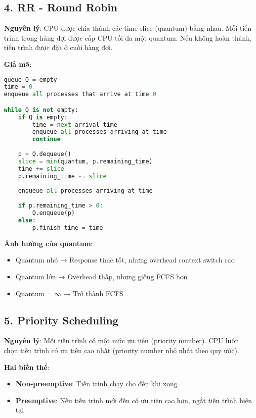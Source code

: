 \subsection{4. RR - Round Robin}

\textbf{Nguyên lý}: CPU được chia thành các time slice (quantum) bằng nhau. 
Mỗi tiến trình trong hàng đợi được cấp CPU tối đa một quantum. 
Nếu không hoàn thành, tiến trình được đặt ở cuối hàng đợi.

\textbf{Giả mã}:
\begin{lstlisting}[language=Python,caption={RR pseudocode}]
queue Q = empty
time = 0
enqueue all processes that arrive at time 0

while Q is not empty:
    if Q is empty:
        time = next arrival time
        enqueue all processes arriving at time
        continue
    
    p = Q.dequeue()
    slice = min(quantum, p.remaining_time)
    time += slice
    p.remaining_time -= slice
    
    enqueue all processes arriving at time
    
    if p.remaining_time > 0:
        Q.enqueue(p)
    else:
        p.finish_time = time
\end{lstlisting}

\textbf{Ảnh hưởng của quantum}:
\begin{itemize}[leftmargin=1.5cm]
  \item Quantum nhỏ → Response time tốt, nhưng overhead context switch cao
  \item Quantum lớn → Overhead thấp, nhưng giống FCFS hơn
  \item Quantum = $\infty$ → Trở thành FCFS
\end{itemize}

\subsection{5. Priority Scheduling}

\textbf{Nguyên lý}: Mỗi tiến trình có một mức ưu tiên (priority number). 
CPU luôn chọn tiến trình có ưu tiên cao nhất (priority number nhỏ nhất theo quy ước).

\textbf{Hai biến thể}:
\begin{itemize}[leftmargin=1.5cm]
  \item \textbf{Non-preemptive}: Tiến trình chạy cho đến khi xong
  \item \textbf{Preemptive}: Nếu tiến trình mới đến có ưu tiên cao hơn, ngắt tiến trình hiện tại
\end{itemize}

